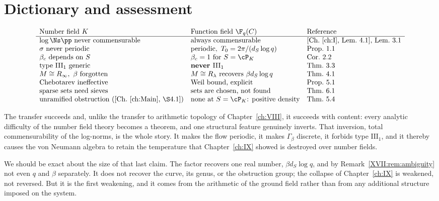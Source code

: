 \section{Dictionary and assessment}

\[
\begin{array}{lll}
\text{Number field }K & \text{Function field }\F_q(C) & \text{Reference}\\\hline
\log\Ns\pp\ \text{never commensurable} & \text{always commensurable} & \text{[Ch.~\ref{ch:I}, Lem.~4.1], Lem.~3.1}\\
\sigma\ \text{never periodic} & \text{periodic},\ T_0=2\pi/(d_S\log q) & \text{Prop.~1.1}\\
\beta_c\ \text{depends on }S & \beta_c=1\ \text{for }S=\cP_K & \text{Cor.~2.2}\\
\text{type }\mathrm{III}_1\ \text{generic} & \textbf{never }\mathrm{III}_1 & \text{Thm.~3.3}\\
M\cong R_\infty,\ \beta\ \text{forgotten} & M\cong R_\lambda\ \text{recovers}\ \beta d_S\log q & \text{Thm.~4.1}\\
\text{Chebotarev ineffective} & \text{Weil bound, explicit} & \text{Prop.~5.1}\\
\text{sparse sets need sieves} & \text{sets are chosen, not found} & \text{Thm.~6.1}\\
\text{unramified obstruction ([Ch.~\ref{ch:Main}, \S4.1])} & \text{none at }S=\cP_K\text{: positive density} & \text{Thm.~5.4}
\end{array}
\]

The transfer succeeds and, unlike the transfer to arithmetic topology of Chapter~\ref{ch:VIII},
it succeeds with content: every analytic difficulty of the number field theory becomes a
theorem, and one structural feature genuinely inverts. That inversion, total commensurability
of the log-norms, is the whole story. It makes the flow periodic, it makes $\Gamma_\beta$
discrete, it forbids type $\mathrm{III}_1$, and it thereby causes the von Neumann algebra to
retain the temperature that Chapter~\ref{ch:IX} showed is destroyed over number fields.

We should be exact about the size of that last claim. The factor recovers one real number,
$\beta d_S\log q$, and by Remark~\ref{XVII:rem:ambiguity} not even $q$ and $\beta$ separately. It
does not recover the curve, its genus, or the obstruction group; the collapse of
Chapter~\ref{ch:IX} is weakened, not reversed. But it is the first weakening, and it comes from
the arithmetic of the ground field rather than from any additional structure imposed on the
system.

